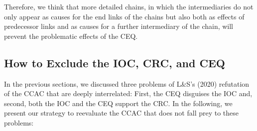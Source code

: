 \documentclass[egregdoesnotlikesansseriftitles,12pt]{scrartcl}
\begin{document}
Therefore, we think that more detailed chains, in which the intermediaries do not only appear as causes for the end links of the chains but also both as effects of predecessor links and as causes for a further intermediary of the chain, will prevent the problematic effects of the CEQ.

\subsection{How to Exclude the IOC, CRC, and CEQ}\label{sec:avoidance}
In the previous sections, we discussed three problems of L\&S's (2020) refutation of the CCAC that are deeply interrelated: First, the CEQ disguises the IOC and, second, both the IOC and the CEQ support the CRC. In the following, we present our strategy to reevaluate the CCAC that does not fall prey to these problems:
\end{document}

